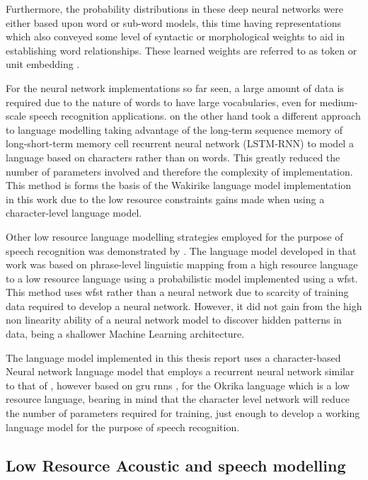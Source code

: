 Furthermore, the probability distributions in these deep neural networks were either based upon word or sub-word models, this time having representations which also conveyed some level of syntactic or morphological weights to aid in establishing word relationships.  These learned weights are referred to as token or unit embedding \citep{pennington-etal-2014-glove}.

For the neural network implementations so far seen, a large amount of data is required due to the nature of words to have large vocabularies, even for medium-scale speech recognition applications.   \cite{kim2016character} on the other hand took a different approach to language modelling taking advantage of the long-term sequence memory of long-short-term memory cell recurrent neural network (LSTM-RNN) to model a language based on characters rather than on words.  This greatly reduced the number of parameters involved and therefore the complexity of implementation.  This method is forms the basis of the Wakirike language model implementation in this work due to the low resource constraints gains made when using a character-level language model.

Other low resource language modelling strategies employed for the purpose of speech recognition was demonstrated by \cite{xu2013cross}.  The language model developed in that work was based on phrase-level linguistic mapping from a high resource language to a low resource language using a probabilistic model implemented using a \acrfull{wfst}.  This method uses \acrshort{wfst} rather than a neural network due to scarcity of training data required to develop a neural network. However, it did not gain from the high non linearity ability of a neural network model to discover hidden patterns in data, being a shallower Machine Learning architecture.

The language model implemented in this thesis report uses a character-based Neural network language model that employs a recurrent neural network similar to that of \cite{kim2016character}, however based on \acrfull{gru} \acrshort{rnns} \citep{cho2014learning}, for the Okrika language which is a low resource language, bearing in mind that the character level network will reduce the number of parameters required for training, just enough to develop a working language model for the purpose of speech recognition. 

\subsection{Low Resource Acoustic and speech modelling}

